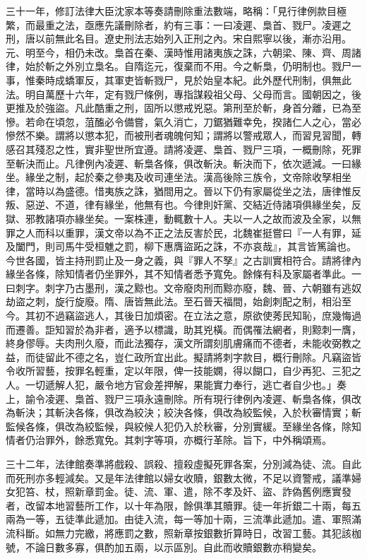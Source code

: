 \begin{pinyinscope}
三十一年，修訂法律大臣沈家本等奏請刪除重法數端，略稱：「見行律例款目極繁，而最重之法，亟應先議刪除者，約有三事：一曰凌遲、梟首、戮尸。凌遲之刑，唐以前無此名目。遼史刑法志始列入正刑之內。宋自熙寧以後，漸亦沿用。元、明至今，相仍未改。梟首在秦、漢時惟用諸夷族之誅，六朝梁、陳、齊、周諸律，始於斬之外別立梟名。自隋迄元，復棄而不用。今之斬梟，仍明制也。戮尸一事，惟秦時成蟜軍反，其軍吏皆斬戮尸，見於始皇本紀。此外歷代刑制，俱無此法。明自萬歷十六年，定有戮尸條例，專指謀殺祖父母、父母而言。國朝因之，後更推及於強盜。凡此酷重之刑，固所以懲戒兇惡。第刑至於斬，身首分離，已為至慘。若命在頃忽，菹醢必令備嘗，氣久消亡，刀鋸猶難幸免，揆諸仁人之心，當必慘然不樂。謂將以懲本犯，而被刑者魂魄何知；謂將以警戒眾人，而習見習聞，轉感召其殘忍之性，實非聖世所宜遵。請將凌遲、梟首、戮尸三項，一概刪除，死罪至斬決而止。凡律例內凌遲、斬梟各條，俱改斬決。斬決而下，依次遞減。一曰緣坐。緣坐之制，起於秦之參夷及收司連坐法。漢高後除三族令，文帝除收孥相坐律，當時以為盛德。惜夷族之誅，猶間用之。晉以下仍有家屬從坐之法，唐律惟反叛、惡逆、不道，律有緣坐，他無有也。今律則奸黨、交結近侍諸項俱緣坐矣，反獄、邪教諸項亦緣坐矣。一案株連，動輒數十人。夫以一人之故而波及全家，以無罪之人而科以重罪，漢文帝以為不正之法反害於民，北魏崔挺嘗曰『一人有罪，延及闔門，則司馬牛受桓魋之罰，柳下惠膺盜跖之誅，不亦哀哉』，其言皆篤論也。今世各國，皆主持刑罰止及一身之義，與『罪人不孥』之古訓實相符合。請將律內緣坐各條，除知情者仍坐罪外，其不知情者悉予寬免。餘條有科及家屬者準此。一曰刺字。刺字乃古墨刑，漢之黥也。文帝廢肉刑而黥亦廢，魏、晉、六朝雖有逃奴劫盜之刺，旋行旋廢。隋、唐皆無此法。至石晉天福間，始創刺配之制，相沿至今。其初不過竊盜逃人，其後日加煩密。在立法之意，原欲使莠民知恥，庶幾悔過而遷善。詎知習於為非者，適予以標識，助其兇橫。而偶罹法網者，則黥刺一膺，終身僇辱。夫肉刑久廢，而此法獨存，漢文所謂刻肌膚痛而不德者，未能收弼教之益，而徒留此不德之名，豈仁政所宜出此。擬請將刺字款目，概行刪除。凡竊盜皆令收所習藝，按罪名輕重，定以年限，俾一技能嫻，得以餬口，自少再犯、三犯之人。一切遞解人犯，嚴令地方官僉差押解，果能實力奉行，逃亡者自少也。」奏上，諭令凌遲、梟首、戮尸三項永遠刪除。所有現行律例內凌遲、斬梟各條，俱改為斬決；其斬決各條，俱改為絞決；絞決各條，俱改為絞監候，入於秋審情實；斬監候各條，俱改為絞監候，與絞候人犯仍入於秋審，分別實緩。至緣坐各條，除知情者仍治罪外，餘悉寬免。其刺字等項，亦概行革除。旨下，中外稱頌焉。

三十二年，法律館奏準將戲殺、誤殺、擅殺虛擬死罪各案，分別減為徒、流。自此而死刑亦多輕減矣。又是年法律館以婦女收贖，銀數太微，不足以資警戒，議準婦女犯笞、杖，照新章罰金。徒、流、軍、遣，除不孝及奸、盜、詐偽舊例應實發者，改留本地習藝所工作，以十年為限，餘俱準其贖罪。徒一年折銀二十兩，每五兩為一等，五徒準此遞加。由徒入流，每一等加十兩，三流準此遞加。遣、軍照滿流科斷。如無力完繳，將應罰之數，照新章按銀數折算時日，改習工藝。其犯該枷號，不論日數多寡，俱酌加五兩，以示區別。自此而收贖銀數亦稍變矣。


\end{pinyinscope}
